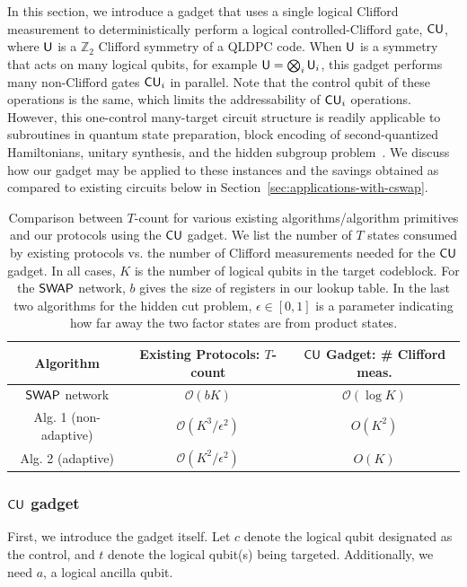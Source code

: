\documentclass[11pt]{article}
\begin{document}
In this section, we introduce a gadget that uses a single logical Clifford measurement to deterministically perform a logical controlled-Clifford gate, $\mathsf{CU}$, where $\mathsf{U}$ is a $\mathbb{Z}_2$ Clifford symmetry of a QLDPC code.
When $\mathsf{U}$ is a symmetry that acts on many logical qubits, for example $\mathsf{U} = \bigotimes_{i}\mathsf{U}_i$, this gadget performs many non-Clifford gates $\mathsf{CU}_i$ in parallel.
Note that the control qubit of these operations is the same, which limits the addressability of $\mathsf{CU}_i$ operations. However, this one-control many-target circuit structure is readily applicable to subroutines in quantum state preparation, block encoding of second-quantized Hamiltonians,  unitary synthesis, and the hidden subgroup problem~\cite{Low_2024,Zhang_2022,liu2025blockencodinglowgate,bouland2024statehiddensubgroupproblem}. We discuss how our gadget may be applied to these instances and the savings obtained as compared to existing circuits below in Section~\ref{sec:applications-with-cswap}.


\begin{table}
    \centering
    \begin{tabular}{|c|c|c|}
        \hline
        \textbf{Algorithm}& \textbf{Existing Protocols: $T$-count} & \textbf{$\mathsf{CU}$ Gadget: \# Clifford meas.} \\
        \hline
         $\mathsf{SWAP}$ network & $\mathcal{O}(bK)$ & $\mathcal{O}(\log K)$\\
         Alg. 1 (non-adaptive) \cite{bouland2024statehiddensubgroupproblem}& $\mathcal{O}(K^3/\epsilon^2)$ & $O(K^2)$\\
         Alg. 2 (adaptive) \cite{bouland2024statehiddensubgroupproblem} & $\mathcal{O}(K^2/\epsilon^2)$ & $O(K)$\\
         \hline
    \end{tabular}
    \caption{Comparison between $T$-count for various existing algorithms/algorithm primitives and our protocols using the $\mathsf{CU}$ gadget. We list the number of $T$ states consumed by existing protocols vs. the number of Clifford measurements needed for the $\mathsf{CU}$ gadget. In all cases, $K$ is the number of logical qubits in the target codeblock. For the $\mathsf{SWAP}$ network, $b$ gives the size of registers in our lookup table. In the last two algorithms for the hidden cut problem, $\epsilon \in [0, 1]$ is a parameter indicating how far away the two factor states are from product states.}
    \label{tab:placeholder}
\end{table}

\subsubsection{$\mathsf{CU}$ gadget}
First, we introduce the gadget itself. Let $c$ denote the logical qubit designated as the control, and $t$ denote the logical qubit(s) being targeted. Additionally, we need $a$, a logical ancilla qubit. 
\end{document}
